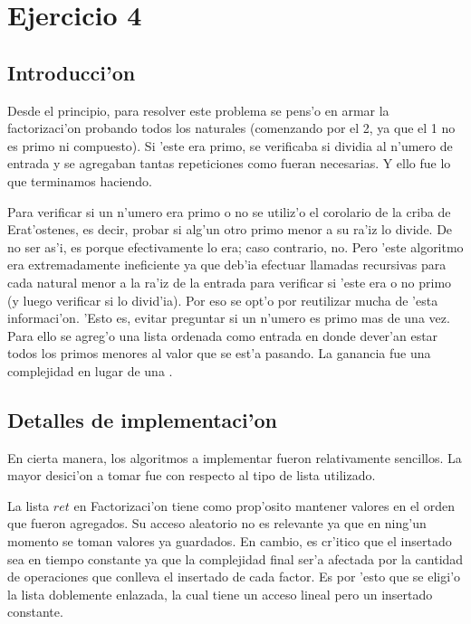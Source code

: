 \newpage
\section{Ejercicio 4}

\subsection{Introducci'on}
Desde el principio, para resolver este problema se pens'o en armar la factorizaci'on probando todos los naturales (comenzando por el 2, ya que el 1 no es primo ni compuesto). Si 'este era primo, se verificaba si dividia al n'umero de entrada y se agregaban tantas repeticiones como fueran necesarias. Y ello fue lo que terminamos haciendo.

Para verificar si un n'umero era primo o no se utiliz'o el corolario de la criba de Erat'ostenes, es decir, probar si alg'un otro primo menor a su ra'iz lo divide. De no ser as'i, es porque efectivamente lo era; caso contrario, no. Pero 'este algoritmo era extremadamente ineficiente ya que deb'ia efectuar llamadas recursivas para cada natural menor a la ra'iz de la entrada para verificar si 'este era o no primo (y luego verificar si lo divid'ia). Por eso se opt'o por reutilizar mucha de 'esta informaci'on. 'Esto es, evitar preguntar si un n'umero es primo mas de una vez. Para ello se agreg'o una lista ordenada como entrada en donde dever'an estar todos los primos menores al valor que se est'a pasando. La ganancia fue una complejidad  en lugar de una .


\subsection{Detalles de implementaci'on}
En cierta manera, los algoritmos a implementar fueron relativamente sencillos. La mayor desici'on a tomar fue con respecto al tipo de lista utilizado. 

La lista $ret$ en Factorizaci'on tiene como prop'osito mantener valores en el orden que fueron agregados. Su acceso aleatorio no es relevante ya que en ning'un momento se toman valores ya guardados. En cambio, es cr'itico que el insertado sea en tiempo constante ya que la complejidad final ser'a afectada por la cantidad de operaciones que conlleva el insertado de cada factor. Es por 'esto que se eligi'o la lista doblemente enlazada, la cual tiene un acceso lineal pero un insertado constante.

